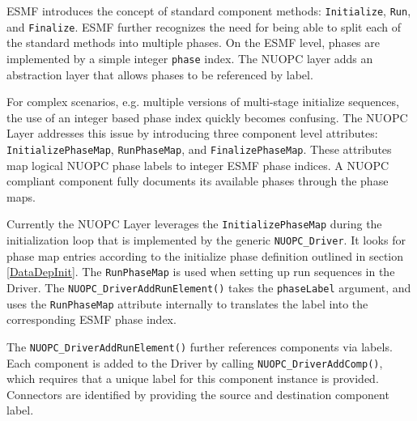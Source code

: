 %

\label{PhaseMaps}

ESMF introduces the concept of standard component methods: {\tt Initialize}, {\tt Run}, and {\tt Finalize}. ESMF further recognizes the need for being able to split each of the standard methods into multiple phases. On the ESMF level, phases are implemented by a simple integer {\tt phase} index. The NUOPC layer adds an abstraction layer that allows phases to be referenced by label.

For complex scenarios, e.g. multiple versions of multi-stage initialize sequences, the use of an integer based phase index quickly becomes confusing. The NUOPC Layer addresses this issue by introducing three component level attributes: {\tt InitializePhaseMap}, {\tt RunPhaseMap}, and {\tt FinalizePhaseMap}. These attributes map logical NUOPC phase labels to integer ESMF phase indices. A NUOPC compliant component fully documents its available phases through the phase maps.

Currently the NUOPC Layer leverages the {\tt InitializePhaseMap} during the initialization loop that is implemented by the generic {\tt NUOPC\_Driver}. It looks for phase map entries according to the initialize phase definition outlined in section \ref{DataDepInit}. The {\tt RunPhaseMap} is used when setting up run sequences in the Driver. The {\tt NUOPC\_DriverAddRunElement()} takes the {\tt phaseLabel} argument, and uses the {\tt RunPhaseMap} attribute internally to translates the label into the corresponding ESMF phase index.

The {\tt NUOPC\_DriverAddRunElement()} further references components via labels. Each component is added to the Driver by calling {\tt NUOPC\_DriverAddComp()}, which requires that a unique label for this component instance is provided. Connectors are identified by providing the source and destination component label.
